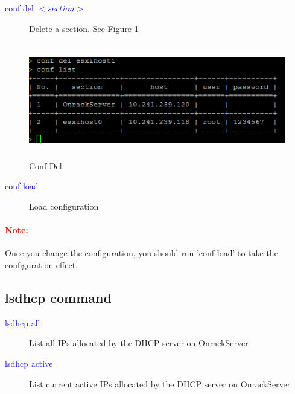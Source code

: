 \documentclass [12pt, a4paper, titlepage]{article}
\begin{document}
        \begin{description}
            \item[\textcolor{blue}{conf del $<section>$}] Delete a section. See Figure \ref{confdel}
        \end{description}

        \begin{figure}[H]
        \begin{center}
        \includegraphics[width=13cm,height=5cm]{png/confdel}
        \end{center}
        \caption{Conf Del}
        \label{confdel}
        \end{figure}

        \begin{description}
            \item[\textcolor{blue}{conf load}] Load configuration
        \end{description}

        \paragraph{\textcolor{red}{Note:}} Once you change the configuration, you should run 'conf load' to take the configuration effect.

\subsection {lsdhcp command}
        \begin{description}
            \item[\textcolor{blue}{lsdhcp all}] List all IPs allocated by the DHCP server on OnrackServer
        \end{description}

        \begin{description}
            \item[\textcolor{blue}{lsdhcp active}] List current active IPs allocated by the DHCP server on OnrackServer
        \end{description}
        
\end{document}

